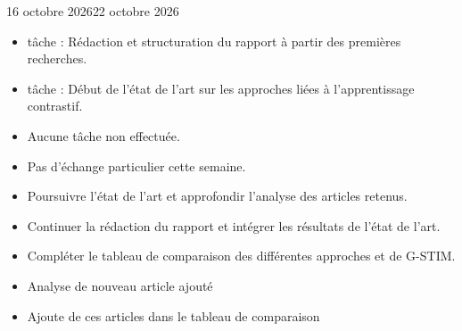 \documentclass[12pt]{fiche-rd-info}
\begin{document}

\begin{fichesuivi}{16 octobre 2026}{22 octobre 2026}

	\begin{travaileffectue}
		\begin{itemize}
		\item tâche : Rédaction et structuration du rapport à partir des premières recherches.
		\item tâche : Début de l'état de l'art sur les approches liées à l'apprentissage contrastif.
		\end{itemize}
	\end{travaileffectue}

	\begin{travailnoneffectue}
		\begin{itemize}
		\item Aucune tâche non effectuée.
		\end{itemize}
	\end{travailnoneffectue}

	\begin{echange}
		\begin{itemize}
		\item Pas d'échange particulier cette semaine.
		\end{itemize}
	\end{echange}

	\begin{planification}
		\begin{itemize}
		\item Poursuivre l'état de l'art et approfondir l'analyse des articles retenus.
		\item Continuer la rédaction du rapport et intégrer les résultats de l'état de l'art.
		\item Compléter le tableau de comparaison des différentes approches et de G-STIM.
		\item Analyse de nouveau article ajouté
		\item Ajoute de ces articles dans le tableau de comparaison
		\end{itemize}
	\end{planification}
\end{fichesuivi}
\end{document}
